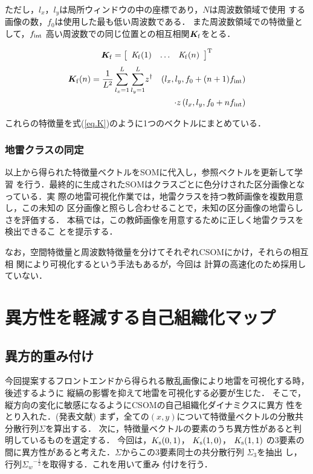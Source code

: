 ﻿\documentclass[12pt,oneside]{jsbook}
\begin{document}
ただし，$l_x，l_y$は局所ウィンドウの中の座標であり，$N$は周波数領域で使用
する画像の数，$f_0$は使用した最も低い周波数である．
 また周波数領域での特徴量として，$f_{\rm int}$
 高い周波数での同じ位置との相互相関${\bm K_{{\rm f}}}$をとる．

 \begin{eqnarray}
  {\bm K_{{\rm f}}} = \left[\begin{array}{ccc}
                      {\it K_{{\rm f}}}(1) & \ldots & {\it K_{{\rm f}}}(n)
                            \end{array} \right]^{\mathrm{T}}
 \end{eqnarray}
 \begin{eqnarray}
{\bm K_{{\rm f}}}(n) = \frac{1}{L^2}\sum_{l_x = 1}^{L}\sum_{l_y =
 1}^{L}&z^{\dagger}&\left(l_x, l_y, f_0+(n+1)f_{{\rm int}}\right)
 \nonumber\\&&\hspace{0em}\cdot
 z\left(l_x, l_y, f_0+nf_{{\rm int}}\right)
\end{eqnarray}

これらの特徴量を式(\ref{eq.K})のように1つのベクトルにまとめている．

\subsection{地雷クラスの同定}
以上から得られた特徴量ベクトルをSOMに代入し，参照ベクトルを更新して学習
を行う．最終的に生成されたSOMはクラスごとに色分けされた区分画像となっている．実
際の地雷可視化作業では，地雷クラスを持つ教師画像を複数用意し，この未知の
区分画像と照らし合わせることで，未知の区分画像の地雷らしさを評価する\cite{2010Nakano}．
本稿では，この教師画像を用意するために正しく地雷クラスを検出できるこ
とを提示する．

なお，空間特徴量と周波数特徴量を分けてそれぞれCSOMにかけ，それらの相互相
 関により可視化するという手法もある\cite{ejiri}が，今回は
計算の高速化のため採用していない．
\newpage
\chapter{異方性を軽減する自己組織化マップ}
\section{異方的重み付け}
今回提案するフロントエンドから得られる散乱画像により地雷を可視化する時，
後述するように
縦縞の影響を抑えて地雷を可視化する必要が生じた．
そこで，縦方向の変化に敏感になるようにCSOMの自己組織化ダイナミクスに異方
性をとり入れた．(発表文献\cite{koyama})
まず，全ての$(x,y)$について特徴量ベクトルの分散共分散行列$\Sigma$を算出する．
次に，特徴量ベクトルの要素のうち異方性があると判明しているものを選定する．
今回は，$K_{{\rm s}}(0,1)$，
$K_{{\rm s}}(1,0)$，
$K_{{\rm s}}(1,1)$
の3要素の間に異方性があると考えた．$\Sigma$からこの3要素同士の共分散行列
$\Sigma_3$を抽出
し，行列${\Sigma_w}^{-\frac{1}{2}}$を取得する．これを用いて重み
付けを行う．
\end{document}

